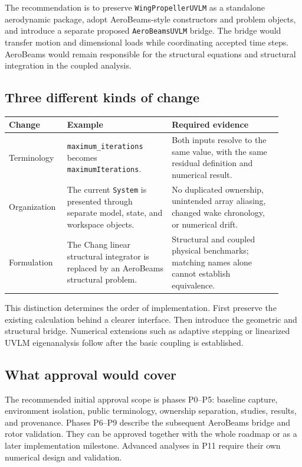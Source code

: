 \documentclass[11pt,a4paper]{article}
\newcommand{\code}{\nolinkurl}
\begin{document}
The recommendation is to preserve \code{WingPropellerUVLM} as a standalone
aerodynamic package, adopt AeroBeams-style constructors and problem objects,
and introduce a separate proposed \code{AeroBeamsUVLM} bridge. The bridge would
transfer motion and dimensional loads while coordinating accepted time steps.
AeroBeams would remain responsible for the structural equations and structural
integration in the coupled analysis.

\subsection{Three different kinds of change}

\begin{longtable}{@{}L{0.18\linewidth}L{0.36\linewidth}L{0.38\linewidth}@{}}
\toprule
Change & Example & Required evidence\\
\midrule\endhead
Terminology & \code{maximum_iterations} becomes
\code{maximumIterations}. & Both inputs resolve to the same value, with the
same residual definition and numerical result.\\
Organization & The current \code{System} is presented through separate model,
state, and workspace objects. & No duplicated ownership, unintended array
aliasing, changed wake chronology, or numerical drift.\\
Formulation & The Chang linear structural integrator is replaced by an
AeroBeams structural problem. & Structural and coupled physical benchmarks;
matching names alone cannot establish equivalence.\\
\bottomrule
\end{longtable}

This distinction determines the order of implementation. First preserve the
existing calculation behind a clearer interface. Then introduce the geometric
and structural bridge. Numerical extensions such as adaptive stepping or
linearized UVLM eigenanalysis follow after the basic coupling is established.

\subsection{What approval would cover}

The recommended initial approval scope is phases P0--P5: baseline capture,
environment isolation, public terminology, ownership separation, studies,
results, and provenance. Phases P6--P9 describe the subsequent AeroBeams bridge
and rotor validation. They can be approved together with the whole roadmap or
as a later implementation milestone. Advanced analyses in P11 require their
own numerical design and validation.
\end{document}
